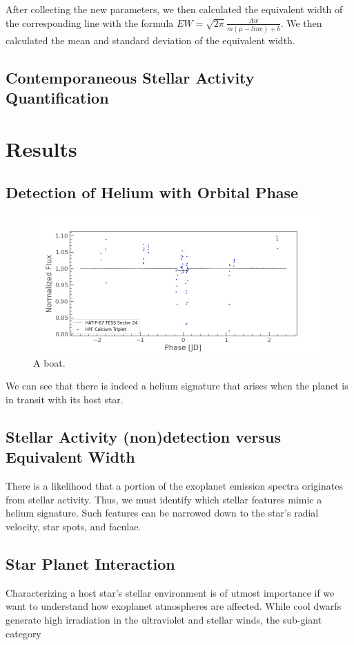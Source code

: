 \documentclass[modern]{aastex631}
\begin{document}
After collecting the new parameters, we then calculated the equivalent width of the corresponding line with the formula $EW=\sqrt{2\pi}\frac{Aw}{m(\mu-line)+b}$. We then calculated the mean and standard deviation of the equivalent width.
\subsection{Contemporaneous Stellar Activity Quantification}



\section{Results}
\subsection{Detection of Helium with Orbital Phase}
\begin{figure}
    \includegraphics[width=\linewidth]{figures/TESS_EW_HAT-P-67.jpg}
    \caption{A boat.}
    \label{fig:boat1}
\end{figure}
We can see that there is indeed a helium signature that arises when the planet is in transit with its host star.
\subsection{Stellar Activity (non)detection versus Equivalent Width}
There is a likelihood that a portion of the exoplanet emission spectra originates from stellar activity. Thus, we must identify which stellar features mimic a helium signature. Such features can be narrowed down to the star's radial velocity, star spots, and faculae.
\subsection{Star Planet Interaction}
Characterizing a host star's stellar environment is of utmost importance if we want to understand how exoplanet atmospheres are affected. While cool dwarfs generate high irradiation in the ultraviolet and stellar winds, the sub-giant category
\end{document}
